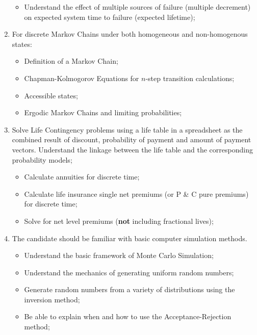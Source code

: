 \documentclass[12pt, titlepage, french]{report}
\begin{document}
\begin{outcomes}
\begin{enumerate}
\begin{itemize}
		\item	Understand the effect of multiple sources of failure (multiple decrement) on expected system time to failure (expected lifetime);
		\end{itemize}
\tcbline
	\item	For discrete Markov Chains under both homogeneous and non-homogenous states:	
		\begin{itemize}
		\item	Definition of a Markov Chain;
		\item	Chapman-Kolmogorov Equations for $n$-step transition calculations;
		\item	Accessible states;
		\item	Ergodic Markov Chains and limiting probabilities;
		\end{itemize}
\tcbline
	\item	Solve Life Contingency problems using a life table in a spreadsheet as the combined result of discount, probability of payment and amount of payment vectors. Understand the linkage between the life table and the corresponding probability models;
		\begin{itemize}
		\item	Calculate annuities for discrete time;
		\item	Calculate life insurance single net premiums (or P \& C pure premiums) for discrete time;
		\item	Solve for net level premiums (\textbf{not} including fractional lives);
		\end{itemize}
\tcbline
	\item	The candidate should be familiar with basic computer simulation methods.
		\begin{itemize}
		\item	Understand the basic framework of Monte Carlo Simulation;
		\item	Understand the mechanics of generating uniform random numbers;
		\item	Generate random numbers from a variety of distributions using the inversion method;
		\item	Be able to explain when and how to use the Acceptance-Rejection method;
		\end{itemize}
\end{enumerate}
\end{outcomes}
\end{document}
